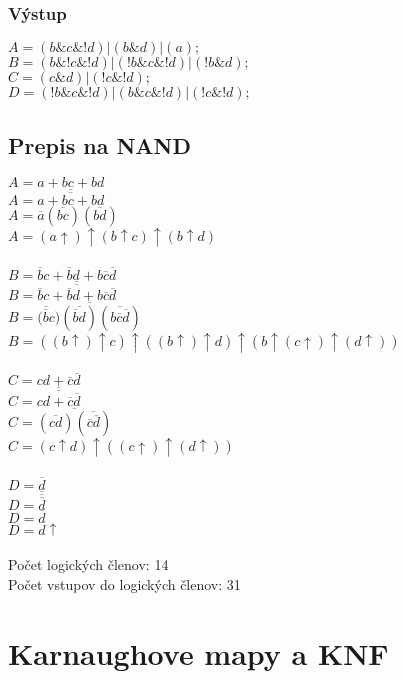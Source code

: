 \documentclass{article}
\begin{document}
\subsubsection{Výstup}
$A = (b\&c\&!d) | (b\&d) | (a);$\\
$B = (b\&!c\&!d) | (!b\&c\&!d) | (!b\&d);$\\
$C = (c\&d) | (!c\&!d);$\\
$D = (!b\&c\&!d) | (b\&c\&!d) | (!c\&!d);$

\subsection{Prepis na NAND}
$A = a + bc + bd$\\
$A = \overline{\overline{a + bc + bd}}$\\
$A = \overline{a}(\overline{bc})(\overline{bd})$\\
$A = (a\uparrow)\uparrow(b\uparrow c)\uparrow(b\uparrow d)$\\\\
$B = \overline{b}c + \overline{b}d + b\overline{c}\overline{d}$\\
$B = \overline{\overline{\overline{b}c + \overline{b}d + b\overline{c}\overline{d}}}$\\
$B = \overline{\overline{(\overline{b}c})(\overline{\overline{b}d})(\overline{b\overline{c}\overline{d}})}$\\
$B = ((b\uparrow)\uparrow c)\uparrow((b\uparrow)\uparrow d)\uparrow(b\uparrow(c\uparrow)\uparrow(d\uparrow))$\\\\
$C = cd + \overline{c}\overline{d}$\\
$C = \overline{\overline{cd + \overline{c}\overline{d}}}$\\
$C = \overline{(\overline{cd})(\overline{\overline{c}\overline{d}})}$\\
$C = (c \uparrow d)\uparrow((c\uparrow)\uparrow(d\uparrow))$\\\\
$D = \overline{d}$\\
$D = \overline{\overline{\overline{d}}}$\\
$D = \overline{d}$\\
$D = d\uparrow$\\\\
Počet logických členov: 14\\
Počet vstupov do logických členov: 31


\section{Karnaughove mapy a KNF}
\end{document}
